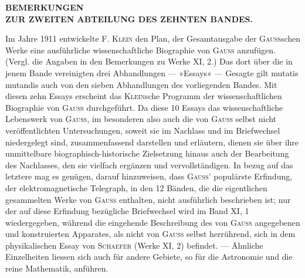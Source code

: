 \clearpage\begingroup\NoSourceHead{}
\begin{center}\bfseries
BEMERKUNGEN\\[3pt]
ZUR ZWEITEN ABTEILUNG DES ZEHNTEN BANDES.
\end{center}
\noindent\hspace*{\parindent}Im Jahre 1911 entwickelte \textsc{F. Klein} den Plan, der Gesamtausgabe der \textsc{Gauss}schen Werke eine
ausführliche wissenschaftliche Biographie von \textsc{Gauss} anzufügen. (Vergl. die Angaben in den Bemerkungen
zu Werke XI, 2.) Das dort über die in jenem Bande vereinigten drei Abhandlungen — »Essays« — Gesagte
gilt mutatis mutandis auch von den sieben Abhandlungen des vorliegenden Bandes. Mit diesen zehn Essays
erscheint das \textsc{Klein}sche Programm der wissenschaftlichen Biographie von \textsc{Gauss} durchgeführt. Da diese
10 Essays das wissenschaftliche Lebenswerk von \textsc{Gauss}, im besonderen also auch die von \textsc{Gauss} selbst
nicht veröffentlichten Untersuchungen, soweit sie im Nachlass und im Briefwechsel niedergelegt sind, zusammenfassend
darstellen und erläutern, dienen sie über ihre unmittelbare biographisch-historische Zielsetzung
hinaus auch der Bearbeitung des Nachlasses, den sie vielfach ergänzen und vervollständigen. In
bezug auf das letztere mag es genügen, darauf hinzuweisen, dass \textsc{Gauss}’ populärste Erfindung, der elektromagnetische
Telegraph, in den 12 Bänden, die die eigentlichen gesammelten Werke von \textsc{Gauss} enthalten,
nicht ausführlich beschrieben ist; nur der auf diese Erfindung bezügliche Briefwechsel wird im Band XI, 1
wiedergegeben, während die eingehende Beschreibung des von \textsc{Gauss} angegebenen und konstruierten
Apparates, als nicht von \textsc{Gauss} selbst herrührend, sich in dem physikalischen Essay von \textsc{Schaefer} (Werke
XI, 2) befindet. — Ähnliche Einzelheiten liessen sich auch für andere Gebiete, so für die Astronomie und
die reine Mathematik, anführen.

